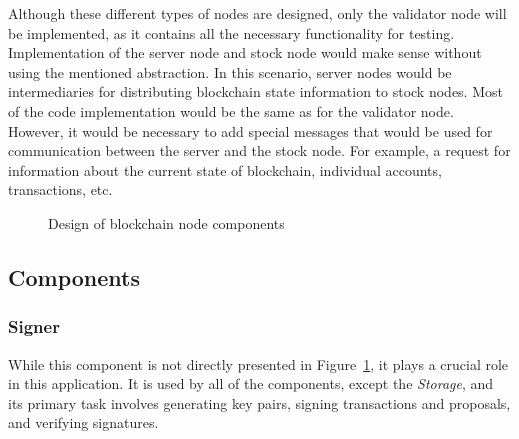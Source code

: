 Although these different types of nodes are designed, only the validator node will be implemented, as it contains all the necessary functionality for testing. Implementation of the server node and stock node would make sense without using the mentioned abstraction. In this scenario, server nodes would be intermediaries for distributing blockchain state information to stock nodes. Most of the code implementation would be the same as for the validator node. However, it would be necessary to add special messages that would be used for communication between the server and the stock node. For example, a request for information about the current state of blockchain, individual accounts, transactions, etc.

\begin{figure}[h]
    \begin{center}
    \end{center}
    \caption{Design of blockchain node components}
    \label{figure:bc.design}
\end{figure}


\subsection{Components}
\label{sec:design.components}

\subsubsection{Signer}

While this component is not directly presented in Figure~\ref{figure:bc.design}, it plays a crucial role in this application. It is used by all of the components, except the \emph{Storage}, and its primary task involves generating key pairs, signing transactions and proposals, and verifying signatures.

